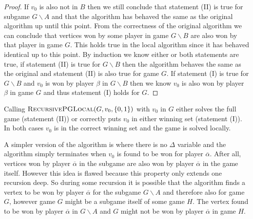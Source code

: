 \begin{theorem}
\begin{proof}
	If $v_0$ is also not in $B$ then we still conclude that statement (II) is true for subgame $G\backslash A$ and that the algorithm has behaved the same as the original algorithm up until this point. From the correctness of the original algorithm we can conclude that vertices won by some player in game $G\backslash B$ are also won by that player in game $G$. This holds true in the local algorithm since it has behaved identical up to this point. By induction we know either or both statements are true, if statement (II) is true for $G\backslash B$ then the algorithm behaves the same as the original and statement (II) is also true for game $G$. If statement (I) is true for $G \backslash B$ and $v_0$ is won by player $\beta$ in $G\backslash B$ then we know $v_0$ is also won by player $\beta$ in game $G$ and thus statement (I) holds for $G$.
\end{proof}
\end{theorem}

Calling $\textsc{RecursivePGLocal}(G, v_0, \{0,1\})$ with $v_0$ in $G$ either solves the full game (statement (II)) or correctly puts $v_0$ in either winning set (statement (I)). In both cases $v_0$ is in the correct winning set and the game is solved locally.

A simpler version of the algorithm is where there is no $\Delta$ variable and the algorithm simply terminates when $v_0$ is found to be won for player $\overline{\alpha}$. After all, vertices won by player $\overline{\alpha}$ in the subgame are also won by player $\overline{\alpha}$ in the game itself. However this idea is flawed because this property only extends one recursion deep. So during some recursion it is possible that the algorithm finds a vertex to be won by player $\overline{\alpha}$ for the subgame $G\backslash A$ and therefore also for game $G$, however game $G$ might be a subgame itself of some game $H$. The vertex found to be won by player $\overline{\alpha}$ in $G\backslash A$ and $G$ might not be won by player $\overline{\alpha}$ in game $H$.

